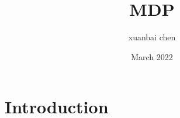 \documentclass{article}
\title{MDP}
\author{xuanbai chen}
\date{March 2022}
\begin{document}
\maketitle

\section{Introduction}
\end{document}
